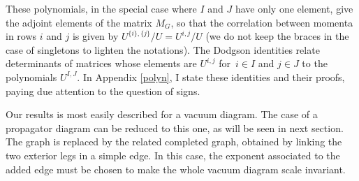 \documentclass[pdftex]{sigma}
\numberwithin{equation}{section}
\begin{document}
These polynomials, in the special case where $I$ and $J$ have only one element,
give the adjoint elements of the matrix $M_G$, so that the correlation between momenta in rows
$i$ and $j$ is given by $U^{\{i\},\{j\}}/U=U^{i,j}/U$ (we do not keep the braces in the case of
singletons to lighten the notations). The Dodgson identities relate determinants of matrices whose elements
are $U^{i,j}$ for~${i \in I}$ and $j \in J$ to the polynomials $U^{I ,J}$. In Appendix \ref{polyn}, I state these
identities and their proofs, paying due attention to the question of signs.

Our results is most easily described for a vacuum diagram. The case of a propagator diagram can be reduced to this one, as will be seen in next
section.
The graph is replaced by the related completed graph,
obtained by linking the two exterior legs in a simple edge. In this case, the exponent associated to the added edge
must be chosen to make the whole vacuum diagram scale invariant.
\end{document}
